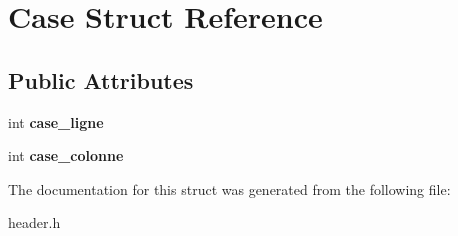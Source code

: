 \hypertarget{structCase}{}\section{Case Struct Reference}
\label{structCase}
\subsection*{Public Attributes}
\begin{DoxyCompactItemize}
\item 
int {\bfseries case\+\_\+ligne}\hypertarget{structCase_a8447b260ea3f8658052af25370ede366}{}\label{structCase_a8447b260ea3f8658052af25370ede366}

\item 
int {\bfseries case\+\_\+colonne}\hypertarget{structCase_af62a103569751de764fd0df68a0cbed5}{}\label{structCase_af62a103569751de764fd0df68a0cbed5}

\end{DoxyCompactItemize}


The documentation for this struct was generated from the following file\+:\begin{DoxyCompactItemize}
\item 
header.\+h\end{DoxyCompactItemize}
